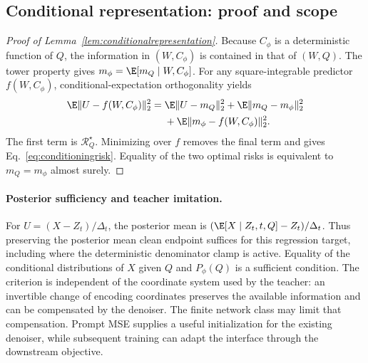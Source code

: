 \subsection{Conditional representation: proof and scope}
\label{app:conditioninglemma}

\begin{proof}[Proof of Lemma~\ref{lem:conditionalrepresentation}]
Because $C_\phi$ is a deterministic function of $Q$, the information in $(W,C_\phi)$ is contained in that of $(W,Q)$. The tower property gives $m_\phi=\E[m_Q\mid W,C_\phi]$. For any square-integrable predictor $f(W,C_\phi)$, conditional-expectation orthogonality yields
\begin{equation}
\begin{split}
 \E\|U-f(W,C_\phi)\|_2^2
 ={}&\E\|U-m_Q\|_2^2+\E\|m_Q-m_\phi\|_2^2\\
 &+\E\|m_\phi-f(W,C_\phi)\|_2^2.
\end{split}
\label{eq:conditioningdecomposition}
\end{equation}
The first term is $\mathcal R_Q^\star$. Minimizing over $f$ removes the final term and gives Eq.~\eqref{eq:conditioningrisk}. Equality of the two optimal risks is equivalent to $m_Q=m_\phi$ almost surely.
\end{proof}

\paragraph{Posterior sufficiency and teacher imitation.}
For $U=(X-Z_t)/\Delta_t$, the posterior mean is $(\E[X\mid Z_t,t,Q]-Z_t)/\Delta_t$. Thus preserving the posterior mean clean endpoint suffices for this regression target, including where the deterministic denominator clamp is active. Equality of the conditional distributions of $X$ given $Q$ and $P_\phi(Q)$ is a sufficient condition. The criterion is independent of the coordinate system used by the teacher: an invertible change of encoding coordinates preserves the available information and can be compensated by the denoiser. The finite network class may limit that compensation. Prompt MSE supplies a useful initialization for the existing denoiser, while subsequent training can adapt the interface through the downstream objective.

